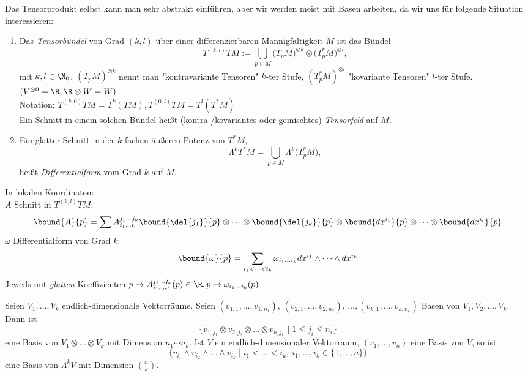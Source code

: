 \begin{rem*}
	Das Tensorprodukt selbst kann man sehr abstrakt einführen, aber wir werden meist mit Basen arbeiten, da wir uns für folgende Situation interessieren:
\end{rem*}

\begin{defn}
	\begin{enumerate}[label= {\roman*})]
		\item Das \emph{Tensorbündel} von Grad $(k,l)$ über einer differenzierbaren Mannigfaltigkeit $M$ ist das Bündel
			\[ T^{(k,l)} TM := \bigcup_{p \in M} \big(T_pM\big)^{\otimes k} \otimes \big(T_p^*M\big)^{\otimes l}, \]
			mit $k,l \in \N_0$. $(T_pM)^{\otimes k}$ nennt man "kontravariante Tensoren" $k$-ter Stufe, $(T_p^*M)^{\otimes l}$ "kovariante Tensoren" $l$-ter Stufe.\hspace{\fill} $ (V^{\otimes 0} = \R, \R \otimes W = W) $\\
			Notation: $ T^{(k,0)} TM = T^k(TM), T^{(0,l)}TM = T^l(T^*M) $\\
			Ein Schnitt in einem solchen Bündel heißt (kontra-/kovariantes oder gemischtes) \emph{Tensorfeld} auf $M$.
		\item Ein glatter Schnitt in der $k$-fachen äußeren Potenz von $T^*M$,
			\[ \Lambda^kT^*M = \bigcup_{p \in M} \Lambda^k \big(T_p^*M\big), \]
			heißt \emph{Differentialform} vom Grad $k$ auf $M$.
	\end{enumerate}
\end{defn}

\begin{rem*}
	In lokalen Koordinaten:\\
	$A$ Schnitt in $T^{(k,l)}TM:$
	\[ \bound{A}{p} = \sum A_{i_1\dots i_l}^{j_1\dots j_k} \bound{\del{j_1}}{p} \otimes \dots \otimes \bound{\del{j_k}}{p} \otimes \bound{dx^{i_1}}{p} \otimes \dots \otimes \bound{dx^{i_l}}{p} \]
	$\omega$ Differentialform von Grad $k$:
	\[ \bound{\omega}{p} = \sum_{i_1 < \dots < i_k} \omega _{i_1\dots i_k} dx^{i_1} \wedge \dots \wedge dx^{i_k} \]
	Jeweils mit \emph{glatten} Koeffizienten $ p \mapsto A_{i_1\dots i_l}^{j_1\dots j_k}(p) \in \R, p \mapsto \omega_{i_1\dots i_k}(p) $
\end{rem*}

\begin{lem}
	Seien $ V_1,\dotsc,V_k $ endlich-dimensionale Vektorräume. Seien $ (v_{1,1}, \dotsc, v_{1,n_1})$, $(v_{2,1}, \dotsc, v_{2,n_2})$, $\dotsc, (v_{k,1}, \dotsc, v_{k,n_k}) $ Basen von $V_1,V_2,\dotsc,V_k$. Dann ist
	\[ \big\{ v_{1,j_1} \otimes v_{2,j_2} \otimes \dots \otimes v_{k,j_k} \mid 1 \leq j_i \leq n_i \big\} \]
	eine Basis von $V_1 \otimes \dots \otimes V_k$ mit Dimension $n_1 \dotsm n_k$. Ist $V$ ein endlich-dimensionaler Vektorraum, $ (v_1,\dotsc,v_n) $ eine Basis von $V$, so ist
	\[ \big\{ v_{i_1} \wedge v_{i_2} \wedge \dots \wedge v_{i_k} \mid i_1 < \dots < i_k,\ i_1,\dotsc,i_k \in \{1,\dotsc,n\} \big\} \]
	eine Basis von $\Lambda^kV$ mit Dimension $\binom{n}{k}$.
\end{lem}

